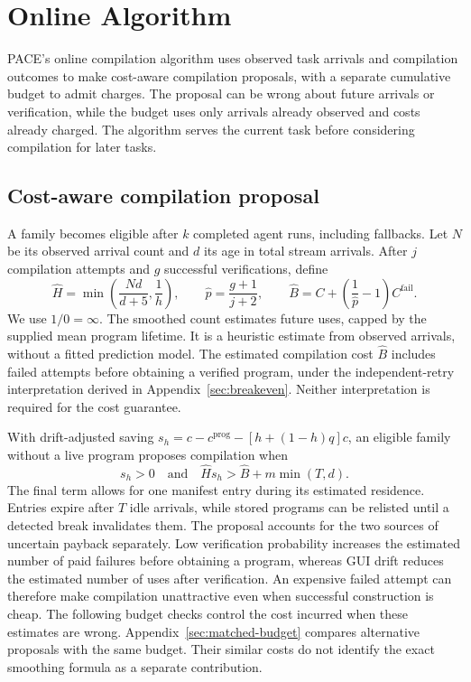 \section{Online Algorithm}
\label{sec:policy}

PACE's online compilation algorithm uses observed task arrivals and compilation outcomes to make cost-aware compilation proposals, with a separate cumulative budget to admit charges.
The proposal can be wrong about future arrivals or verification, while the budget uses only arrivals already observed and costs already charged.
The algorithm serves the current task before considering compilation for later tasks.

\subsection{Cost-aware compilation proposal}
\label{sec:fullpolicy}

A family becomes eligible after $k$ completed agent runs, including fallbacks.
Let $N$ be its observed arrival count and $d$ its age in total stream arrivals.
After $j$ compilation attempts and $g$ successful verifications, define
\begin{equation}
\hat H=\min\!\left(\frac{Nd}{d+5},\frac1h\right),\qquad
\hat p=\frac{g+1}{j+2},\qquad
\hat B=C+\left(\frac1{\hat p}-1\right)C^{\mathrm{fail}}.
\label{eq:estimated-price}
\end{equation}
We use $1/0=\infty$.
The smoothed count estimates future uses, capped by the supplied mean program lifetime.
It is a heuristic estimate from observed arrivals, without a fitted prediction model.
The estimated compilation cost $\hat B$ includes failed attempts before obtaining a verified program, under the independent-retry interpretation derived in Appendix~\ref{sec:breakeven}.
Neither interpretation is required for the cost guarantee.

With drift-adjusted saving $s_h=c-c^{\mathrm{prog}}-[h+(1-h)q]c$, an eligible family without a live program proposes compilation when
\begin{equation}
s_h>0\quad\text{and}\quad\hat Hs_h>\hat B+m\min(T,d).
\label{eq:trigger}
\end{equation}
The final term allows for one manifest entry during its estimated residence.
Entries expire after $T$ idle arrivals, while stored programs can be relisted until a detected break invalidates them.
The proposal accounts for the two sources of uncertain payback separately.
Low verification probability increases the estimated number of paid failures before obtaining a program, whereas GUI drift reduces the estimated number of uses after verification.
An expensive failed attempt can therefore make compilation unattractive even when successful construction is cheap.
The following budget checks control the cost incurred when these estimates are wrong.
Appendix~\ref{sec:matched-budget} compares alternative proposals with the same budget.
Their similar costs do not identify the exact smoothing formula as a separate contribution.

